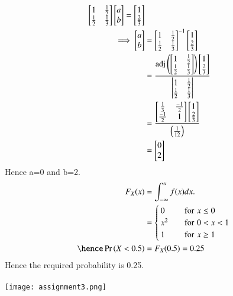 \documentclass[journal,12pt,twocolumn]{IEEEtran}
\begin{document}
\begin{align}
\begin{bmatrix}
1 & \frac{1}{2}\\
\frac{1}{2} & \frac{1}{3}
\end{bmatrix}
\begin{bmatrix}
a\\
b
\end{bmatrix}
=\begin{bmatrix}
1\\
\frac{2}{3}
\end{bmatrix}\\
\implies 
\begin{bmatrix}
a\\
b
\end{bmatrix}
&=\begin{bmatrix}
1 & \frac{1}{2}\\
\frac{1}{2} & \frac{1}{3}
\end{bmatrix}^{-1}
\begin{bmatrix}
1\\
\frac{2}{3}
\end{bmatrix}\\
&=\frac{\text{adj}\left(\begin{bmatrix}
1 & \frac{1}{2}\\
\frac{1}{2} & \frac{1}{3}
\end{bmatrix}\right)\begin{bmatrix}
1\\
\frac{2}{3}
\end{bmatrix}}{\begin{vmatrix}
1 & \frac{1}{2}\\
\frac{1}{2} & \frac{1}{3}
\end{vmatrix}}\\
&=\frac{\begin{bmatrix}
\frac{1}{3} & \frac{-1}{2}\\
\frac{-1}{2} & 1
\end{bmatrix}\begin{bmatrix}
1\\
\frac{2}{3}
\end{bmatrix}}{\left(\frac{1}{12}\right)}\\
&=\begin{bmatrix}
0\\
2
\end{bmatrix}
\end{align}
Hence a=0 and b=2.
\begin{align}
F_{X}(x)&=\int_{-\infty}^{x}f(x)dx.\\
        &=\begin{cases}
        0 \quad &\text{for}\,\, x\leq0\\
        x^{2} \quad &\text{for}\,\, 0<x<1\\
        1 \quad &\text{for} \,\, x\geq1
               \end{cases}\\
\hence \pr{X<0.5}&=F_{X}(0.5)=0.25
\end{align}
Hence the required probability is 0.25.\\\\
\texttt{[image: assignment3.png]}
\end{document}
